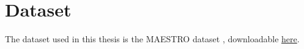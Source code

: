 \documentclass[../main.tex]{subfiles}
\begin{document}
\section{Dataset}
    
    The dataset used in this thesis is the MAESTRO dataset
    \cite{hawthorne2018enabling}, downloadable
    \href{https://magenta.tensorflow.org/datasets/maestro}{here}.

    

    
\end{document}
